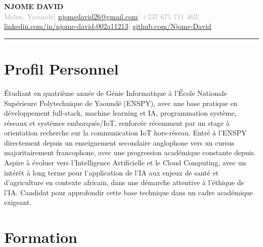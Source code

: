 \documentclass[10pt, a4paper]{article}
\begin{document}

{\LARGE\bfseries\color{navyblue} NJOME DAVID}\\[4pt]
{\small\textcolor{darkgray}{%
  Melen, Yaoundé\quad|\quad
  \href{mailto:njomedavid26@gmail.com}{njomedavid26@gmail.com}\quad|\quad
  +237 671 711 462\quad|\quad
  \href{https://www.linkedin.com/in/njome-david-002a11213}{linkedin.com/in/njome-david-002a11213}\quad|\quad
  \href{https://github.com/Njome-David}{github.com/Njome-David}
}}

\vspace{4pt}
\textcolor{navyblue}{\rule{\linewidth}{1.8pt}}
\vspace{2pt}

\section{Profil Personnel}

Étudiant en quatrième année de Génie Informatique à l'École Nationale Supérieure Polytechnique
de Yaoundé (ENSPY), avec une base pratique en développement full-stack, machine learning et IA, programmation système,
réseaux et systèmes embarqués/IoT, renforcée récemment par un stage à
orientation recherche sur la communication IoT hors-réseau. Entré à l'ENSPY directement depuis
un enseignement secondaire anglophone vers un cursus majoritairement francophone, avec une
progression académique constante depuis. Aspire à évoluer vers l'Intelligence Artificielle et le
Cloud Computing, avec un intérêt à long terme pour l'application de l'IA aux enjeux de santé et
d'agriculture en contexte africain, dans une démarche attentive à l'éthique de l'IA. Candidat
pour approfondir cette base technique dans un cadre académique exigeant.

\section{Formation}
\end{document}
